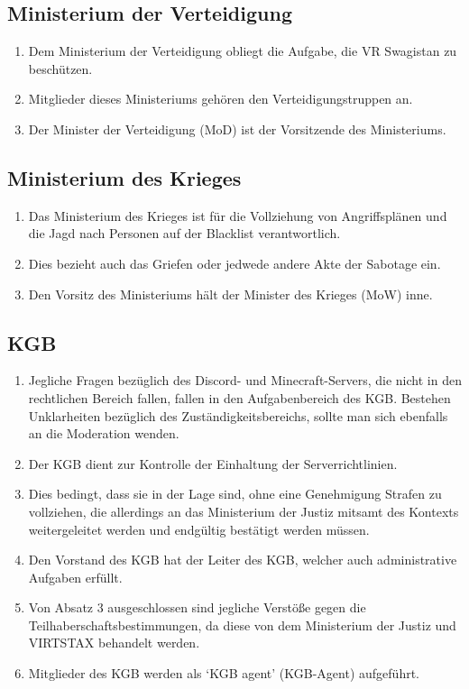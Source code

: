 \documentclass{article}
\begin{document}
\subsection{Ministerium der Verteidigung}
\begin{enumerate}[(1)]
    \item Dem Ministerium der Verteidigung obliegt die Aufgabe, die VR Swagistan zu beschützen.
    \item Mitglieder dieses Ministeriums gehören den Verteidigungstruppen an.
    \item Der Minister der Verteidigung (MoD) ist der Vorsitzende des Ministeriums.
\end{enumerate}

\subsection{Ministerium des Krieges}
\begin{enumerate}[(1)]
    \item Das Ministerium des Krieges ist für die Vollziehung von Angriffsplänen und die Jagd nach Personen auf der Blacklist verantwortlich.
    \item Dies bezieht auch das Griefen oder jedwede andere Akte der Sabotage ein.
    \item Den Vorsitz des Ministeriums hält der Minister des Krieges (MoW) inne.
\end{enumerate}

\subsection{KGB}\label{support}
\begin{enumerate}[(1)]
	\item Jegliche Fragen bezüglich des Discord- und Minecraft-Servers, die nicht in den rechtlichen Bereich fallen, fallen in den Aufgabenbereich des KGB. Bestehen Unklarheiten bezüglich des Zuständigkeitsbereichs, sollte man sich ebenfalls an die Moderation wenden.
	\item Der KGB dient zur Kontrolle der Einhaltung der Serverrichtlinien.
	\item Dies bedingt, dass sie in der Lage sind, ohne eine Genehmigung Strafen zu vollziehen, die allerdings an das Ministerium der Justiz mitsamt des Kontexts weitergeleitet werden und endgültig bestätigt werden müssen.
	\item Den Vorstand des KGB hat der Leiter des KGB, welcher auch administrative Aufgaben erfüllt.
	\item Von Absatz 3 ausgeschlossen sind jegliche Verstöße gegen die Teilhaberschaftsbestimmungen, da diese von dem Ministerium der Justiz und VIRTSTAX behandelt werden.
	\item Mitglieder des KGB werden als `KGB agent' (KGB-Agent) aufgeführt.
\end{enumerate}
\end{document}
